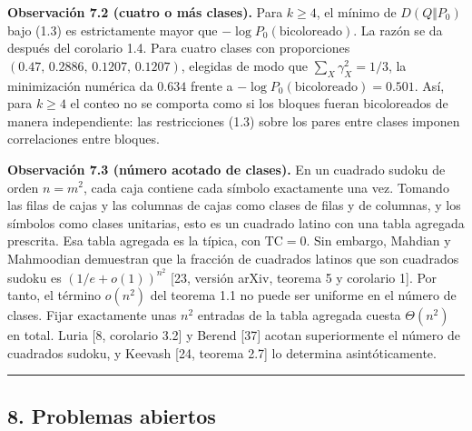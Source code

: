 \documentclass[spanish,11pt,a4paper]{article}
\begin{document}
\textbf{Observación 7.2 (cuatro o más clases).} Para \(k\ge4\), el mínimo de \(D(Q\Vert P_0)\) bajo (1.3) es estrictamente mayor que \(-\log P_0(\text{bicoloreado})\). La razón se da después del corolario 1.4. Para cuatro clases con proporciones \((0.47,\,0.2886,\,0.1207,\,0.1207)\), elegidas de modo que \(\sum_X\gamma_X^2=1/3\), la minimización numérica da \(0.634\) frente a \(-\log P_0(\text{bicoloreado})=0.501\). Así, para \(k\ge4\) el conteo no se comporta como si los bloques fueran bicoloreados de manera independiente: las restricciones (1.3) sobre los pares entre clases imponen correlaciones entre bloques.

\textbf{Observación 7.3 (número acotado de clases).} En un cuadrado sudoku de orden \(n=m^2\), cada caja contiene cada símbolo exactamente una vez. Tomando las filas de cajas y las columnas de cajas como clases de filas y de columnas, y los símbolos como clases unitarias, esto es un cuadrado latino con una tabla agregada prescrita. Esa tabla agregada es la típica, con \(\mathrm{TC}=0\). Sin embargo, Mahdian y Mahmoodian demuestran que la fracción de cuadrados latinos que son cuadrados sudoku es \((1/e+o(1))^{n^2}\) {[}23, versión arXiv, teorema 5 y corolario 1{]}. Por tanto, el término \(o(n^2)\) del teorema 1.1 no puede ser uniforme en el número de clases. Fijar exactamente unas \(n^2\) entradas de la tabla agregada cuesta \(\Theta(n^2)\) en total. Luria {[}8, corolario 3.2{]} y Berend {[}37{]} acotan superiormente el número de cuadrados sudoku, y Keevash {[}24, teorema 2.7{]} lo determina asintóticamente.

\begin{center}\rule{0.5\linewidth}{0.5pt}\end{center}

\subsection{8. Problemas abiertos}\label{problemas-abiertos}
\end{document}
